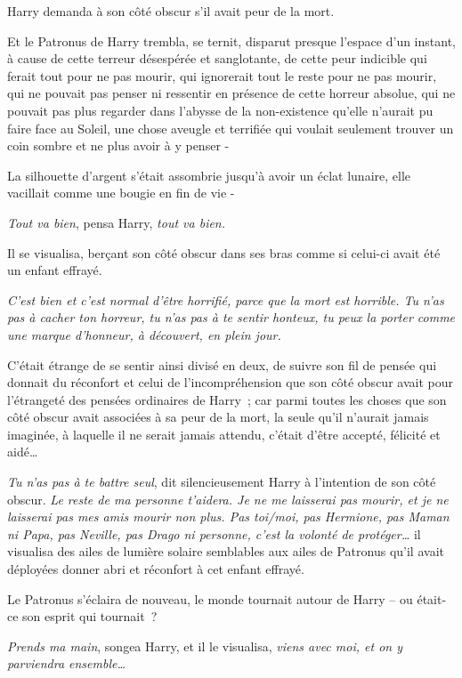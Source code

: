 Harry demanda à son côté obscur s'il avait peur de la mort.

Et le Patronus de Harry trembla, se ternit, disparut presque l'espace d'un instant, à cause de cette terreur désespérée et sanglotante, de cette peur indicible qui ferait tout pour ne pas mourir, qui ignorerait tout le reste pour ne pas mourir, qui ne pouvait pas penser ni ressentir en présence de cette horreur absolue, qui ne pouvait pas plus regarder dans l'abysse de la non-existence qu'elle n'aurait pu faire face au Soleil, une chose aveugle et terrifiée qui voulait seulement trouver un coin sombre et ne plus avoir à y penser -

La silhouette d'argent s'était assombrie jusqu'à avoir un éclat lunaire, elle vacillait comme une bougie en fin de vie -

\emph{Tout va bien}, pensa Harry, \emph{tout va bien.}

Il se visualisa, berçant son côté obscur dans ses bras comme si celui-ci avait été un enfant effrayé.

\emph{C'est bien et c'est normal d'être horrifié, parce que la mort est horrible. Tu n'as pas à cacher ton horreur, tu n'as pas à te sentir honteux, tu peux la porter comme une marque d'honneur, à découvert, en plein jour.}

C'était étrange de se sentir ainsi divisé en deux, de suivre son fil de pensée qui donnait du réconfort et celui de l'incompréhension que son côté obscur avait pour l'étrangeté des pensées ordinaires de Harry~; car parmi toutes les choses que son côté obscur avait associées à sa peur de la mort, la seule qu'il n'aurait jamais imaginée, à laquelle il ne serait jamais attendu, c'était d'être accepté, félicité et aidé…

\emph{Tu n'as pas à te battre seul}, dit silencieusement Harry à l'intention de son côté obscur. \emph{Le reste de ma personne t'aidera. Je ne me laisserai pas mourir, et je ne laisserai pas mes amis mourir non plus. Pas toi/moi, pas Hermione, pas Maman ni Papa, pas Neville, pas Drago ni personne, c'est la volonté de protéger…} il visualisa des ailes de lumière solaire semblables aux ailes de Patronus qu'il avait déployées donner abri et réconfort à cet enfant effrayé.

Le Patronus s'éclaira de nouveau, le monde tournait autour de Harry -- ou était-ce son esprit qui tournait~?

\emph{Prends ma main}, songea Harry, et il le visualisa, \emph{viens avec moi, et on y parviendra ensemble…}

